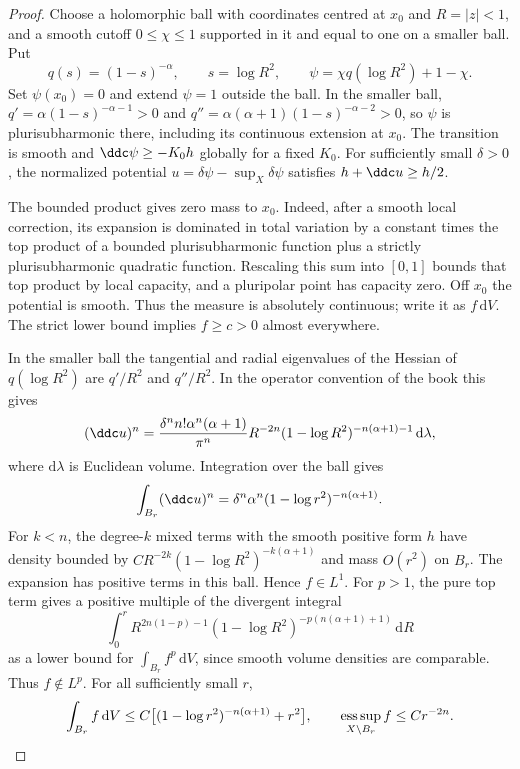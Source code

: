 \begin{proof}
Choose a holomorphic ball with coordinates centred at $x_0$ and $R=|z|<1$, and a smooth cutoff $0\leq\chi\leq1$ supported in it and equal to one on a smaller ball. Put
\[
 q(s)=(1-s)^{-\alpha},\qquad s=\log R^2,
 \qquad \psi=\chi q(\log R^2)+1-\chi.
\]
Set $\psi(x_0)=0$ and extend $\psi=1$ outside the ball. In the smaller ball, $q'=\alpha(1-s)^{-\alpha-1}>0$ and $q''=\alpha(\alpha+1)(1-s)^{-\alpha-2}>0$, so $\psi$ is plurisubharmonic there, including its continuous extension at $x_0$. The transition is smooth and $\ddc\psi\geq-K_0h$ globally for a fixed $K_0$. For sufficiently small $\delta>0$, the normalized potential $u=\delta\psi-\sup_X\delta\psi$ satisfies $h+\ddc u\geq h/2$.

The bounded product gives zero mass to $x_0$. Indeed, after a smooth local correction, its expansion is dominated in total variation by a constant times the top product of a bounded plurisubharmonic function plus a strictly plurisubharmonic quadratic function. Rescaling this sum into $[0,1]$ bounds that top product by local capacity, and a pluripolar point has capacity zero. Off $x_0$ the potential is smooth. Thus the measure is absolutely continuous; write it as $f\,\mathrm dV$. The strict lower bound implies $f\geq c>0$ almost everywhere.

In the smaller ball the tangential and radial eigenvalues of the Hessian of $q(\log R^2)$ are $q'/R^2$ and $q''/R^2$. In the operator convention of the book this gives
\begin{equation}\label{eq:logarithmic-density-radial}
 (\ddc u)^n
 =\frac{\delta^nn!\alpha^n(\alpha+1)}{\pi^n}
    R^{-2n}(1-\log R^2)^{-n(\alpha+1)-1}\,\mathrm d\lambda,
\end{equation}
where $\mathrm d\lambda$ is Euclidean volume. Integration over the ball gives
\[
 \int_{B_r}(\ddc u)^n
       =\delta^n\alpha^n(1-\log r^2)^{-n(\alpha+1)}.
\]
For $k<n$, the degree-$k$ mixed terms with the smooth positive form $h$ have density bounded by
$CR^{-2k}(1-\log R^2)^{-k(\alpha+1)}$ and mass $O(r^2)$ on $B_r$. The expansion has positive terms in this ball. Hence $f\in L^1$. For $p>1$, the pure top term gives a positive multiple of the divergent integral
\[
 \int_0^r R^{2n(1-p)-1}
       (1-\log R^2)^{-p(n(\alpha+1)+1)}\,\mathrm dR
\]
as a lower bound for $\int_{B_r}f^p\,\mathrm dV$, since smooth volume densities are comparable. Thus $f\notin L^p$. For all sufficiently small $r$,
\begin{equation}\label{eq:logarithmic-density-ball}
 \int_{B_r}f\,\mathrm dV
 \leq C\bigl[(1-\log r^2)^{-n(\alpha+1)}+r^2\bigr],
 \qquad \mathop{\rm ess\,sup}_{X\setminus B_r}f\leq Cr^{-2n}.
\end{equation}


\end{proof}
